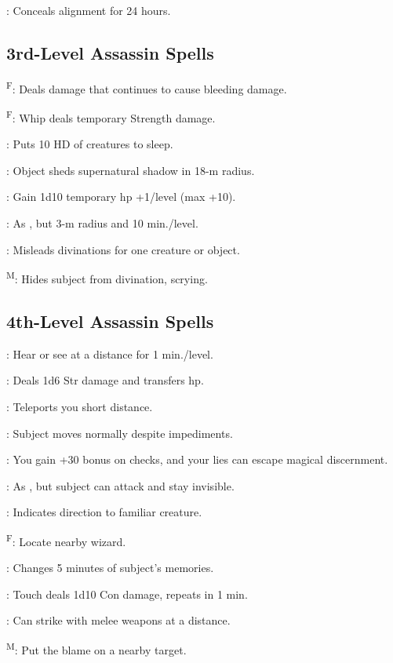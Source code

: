 : Conceals alignment for 24 hours.




\subsection{3rd-Level Assassin Spells}

\textsuperscript{F}: Deals damage that continues to cause bleeding damage.%

\textsuperscript{F}: Whip deals temporary Strength damage. %

: Puts 10 HD of creatures to sleep.

: Object sheds supernatural shadow in 18-m radius.

: Gain 1d10 temporary hp +1/level (max +10).

: As , but 3-m radius and 10 min./level.

: Misleads divinations for one creature or object.

\textsuperscript{M}: Hides subject from divination, scrying.




\subsection{4th-Level Assassin Spells}

: Hear or see at a distance for 1 min./level.

: Deals 1d6 Str damage and transfers hp. %

: Teleports you short distance.

: Subject moves normally despite impediments.

: You gain +30 bonus on  checks, and your lies can escape magical discernment.

: As , but subject can attack and stay invisible.

: Indicates direction to familiar creature.

\textsuperscript{F}: Locate nearby wizard. %

: Changes 5 minutes of subject’s memories.

: Touch deals 1d10 Con damage, repeats in 1 min.

: Can strike with melee weapons at a distance. %

\textsuperscript{M}: Put the blame on a nearby target. %
